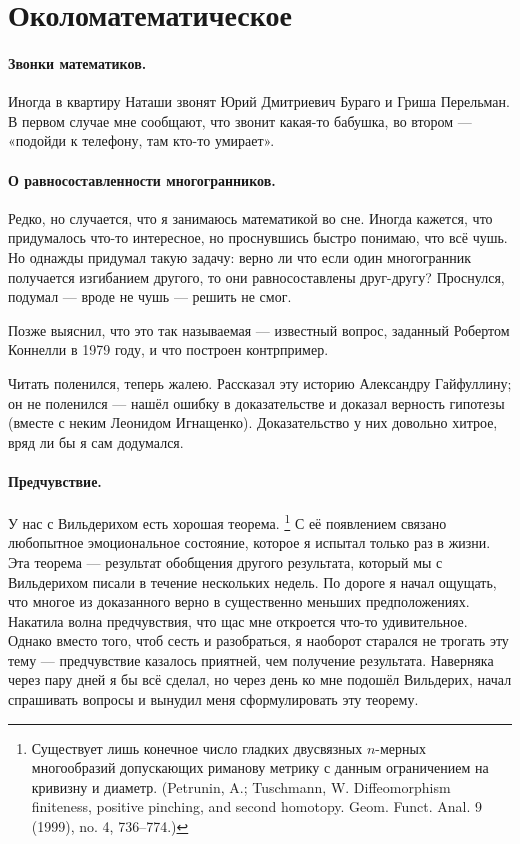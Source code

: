\documentclass{book}
\begin{document}
\section*{Околоматематическое}

\paragraph{Звонки математиков.}
Иногда в квартиру Наташи звонят Юрий Дмитриевич Бураго и Гриша Перельман.
В первом случае мне сообщают, что звонит какая-то бабушка, во втором --- «подойди к телефону, там кто-то умирает».

\paragraph{О равносоставленности многогранников.}
Редко, но случается, что я занимаюсь математикой во сне.
Иногда кажется, что придумалось что-то интересное, но проснувшись быстро понимаю, что всё чушь.
Но однажды придумал такую задачу: верно ли что если один многогранник получается изгибанием другого, то они равносоставлены друг-другу?
Проснулся, подумал --- вроде не чушь --- решить не смог.

Позже выяснил, что это так называемая  --- известный вопрос, заданный Робертом Коннелли в 1979 году, и что построен контрпример.

Читать поленился, теперь жалею.
Рассказал эту историю Александру Гайфуллину; он не поленился --- нашёл ошибку в доказательстве и доказал верность гипотезы (вместе с неким Леонидом Игнащенко).
Доказательство у них довольно хитрое, вряд ли бы я сам додумался.

\paragraph{Предчувствие.}
У нас с Вильдерихом есть хорошая теорема.%
\footnote{Существует лишь конечное число гладких двусвязных $n$-мерных многообразий допускающих риманову метрику с данным ограничением на кривизну и диаметр. (Petrunin, A.; Tuschmann, W. Diffeomorphism finiteness, positive pinching, and second homotopy. Geom. Funct. Anal. 9 (1999), no. 4, 736--774.)}
С её появлением связано любопытное эмоциональное состояние, которое я испытал только раз в жизни.
Эта теорема --- результат обобщения другого результата, который мы с Вильдерихом писали в течение нескольких недель.
По дороге я начал ощущать, что многое из доказанного верно в существенно меньших предположениях.
Накатила волна предчувствия, что щас мне откроется что-то удивительное.
Однако вместо того, чтоб сесть и разобраться, я наоборот старался не трогать эту тему --- предчувствие казалось приятней, чем получение результата.
Наверняка через пару дней я бы всё сделал, но через день ко мне подошёл Вильдерих, начал спрашивать вопросы и вынудил меня сформулировать эту теорему.
\end{document}
